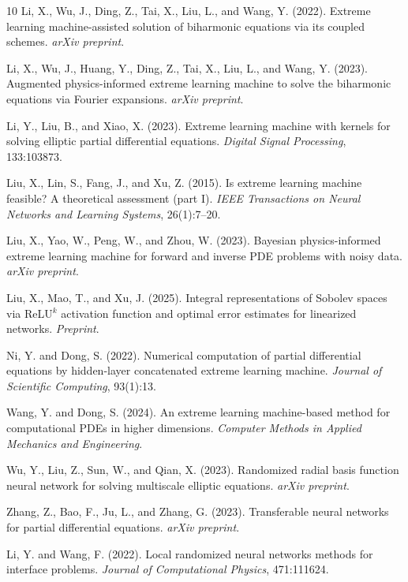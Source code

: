 \documentclass[11pt]{article}
\begin{document}
\begin{thebibliography}{10}
Li, X., Wu, J., Ding, Z., Tai, X., Liu, L., and Wang, Y. (2022).
\newblock Extreme learning machine-assisted solution of biharmonic equations via its coupled schemes.
\newblock \emph{arXiv preprint}.

Li, X., Wu, J., Huang, Y., Ding, Z., Tai, X., Liu, L., and Wang, Y. (2023).
\newblock Augmented physics-informed extreme learning machine to solve the biharmonic equations via Fourier expansions.
\newblock \emph{arXiv preprint}.

Li, Y., Liu, B., and Xiao, X. (2023).
\newblock Extreme learning machine with kernels for solving elliptic partial differential equations.
\newblock \emph{Digital Signal Processing}, 133:103873.

Liu, X., Lin, S., Fang, J., and Xu, Z. (2015).
\newblock Is extreme learning machine feasible? A theoretical assessment (part I).
\newblock \emph{IEEE Transactions on Neural Networks and Learning Systems}, 26(1):7--20.

Liu, X., Yao, W., Peng, W., and Zhou, W. (2023).
\newblock Bayesian physics-informed extreme learning machine for forward and inverse PDE problems with noisy data.
\newblock \emph{arXiv preprint}.

Liu, X., Mao, T., and Xu, J. (2025).
\newblock Integral representations of Sobolev spaces via ReLU$^k$ activation function and optimal error estimates for linearized networks.
\newblock \emph{Preprint}.

Ni, Y. and Dong, S. (2022).
\newblock Numerical computation of partial differential equations by hidden-layer concatenated extreme learning machine.
\newblock \emph{Journal of Scientific Computing}, 93(1):13.

Wang, Y. and Dong, S. (2024).
\newblock An extreme learning machine-based method for computational PDEs in higher dimensions.
\newblock \emph{Computer Methods in Applied Mechanics and Engineering}.

Wu, Y., Liu, Z., Sun, W., and Qian, X. (2023).
\newblock Randomized radial basis function neural network for solving multiscale elliptic equations.
\newblock \emph{arXiv preprint}.

Zhang, Z., Bao, F., Ju, L., and Zhang, G. (2023).
\newblock Transferable neural networks for partial differential equations.
\newblock \emph{arXiv preprint}.

Li, Y. and Wang, F. (2022).
\newblock Local randomized neural networks methods for interface problems.
\newblock \emph{Journal of Computational Physics}, 471:111624.

\end{thebibliography}
\end{document}
